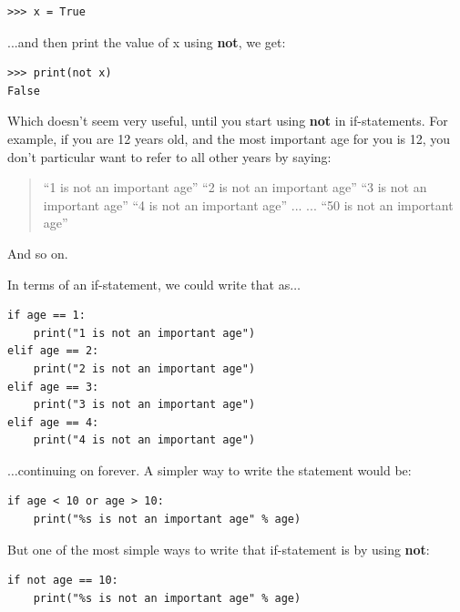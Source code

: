 \begin{listing}
\begin{verbatim}
>>> x = True
\end{verbatim}
\end{listing}

...and then print the value of x using \textbf{not}, we get:

\begin{listing}
\begin{verbatim}
>>> print(not x)
False
\end{verbatim}
\end{listing}

Which doesn't seem very useful, until you start using \textbf{not} in if-statements.  For example, if you are 12 years old, and the most important age for you is 12, you don't particular want to refer to all other years by saying:

\begin{quotation}
``1 is not an important age''
``2 is not an important age''
``3 is not an important age''
``4 is not an important age''
...
...
``50 is not an important age''
\end{quotation}

And so on.
\par\noindent
In terms of an if-statement, we could write that as$\ldots$

\begin{listing}
\begin{verbatim}
if age == 1:
    print("1 is not an important age")
elif age == 2:
    print("2 is not an important age")
elif age == 3:
    print("3 is not an important age")
elif age == 4:
    print("4 is not an important age")
\end{verbatim}
\end{listing}

\noindent
$\ldots$continuing on forever. A simpler way to write the statement would be:

\begin{listing}
\begin{verbatim}
if age < 10 or age > 10:
    print("%s is not an important age" % age)
\end{verbatim}
\end{listing}

\noindent
But one of the most simple ways to write that if-statement is by using \textbf{not}:

\begin{listing}
\begin{verbatim}
if not age == 10:
    print("%s is not an important age" % age)
\end{verbatim}
\end{listing}

